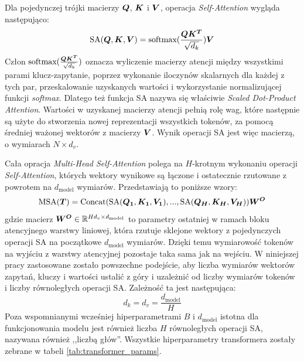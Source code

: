 Dla pojedynczej trójki macierzy $\boldsymbol{Q}$, $\boldsymbol{K}$ i $\boldsymbol{V}$, operacja
\emph{Self-Attention} wygląda następująco:
\begin{equation} \label{eq:sa}
    \textrm{SA}(\boldsymbol{Q}, \boldsymbol{K}, \boldsymbol{V}) = \textrm{softmax}(\frac{\boldsymbol{Q}\boldsymbol{K^T}}{\sqrt{d_k}})\boldsymbol{V}
\end{equation}
Człon $\textrm{softmax}(\frac{\boldsymbol{Q}\boldsymbol{K^T}}{\sqrt{d_k}})$ oznacza wyliczenie macierzy
atencji między wszystkimi parami klucz-zapytanie, poprzez wykonanie iloczynów skalarnych dla
każdej z tych par, przeskalowanie uzyskanych wartości i wykorzystanie normalizującej funkcji
\emph{softmax}. Dlatego też funkcja SA nazywa się właściwie \emph{Scaled Dot-Product Attention}.
Wartości w uzyskanej macierzy atencji pełnią rolę wag, które następnie są użyte do stworzenia
nowej reprezentacji wszystkich tokenów, za pomocą średniej ważonej wektorów z macierzy $\boldsymbol{V}$.
Wynik operacji SA jest więc macierzą, o wymiarach $N \times d_v$.

Cała opracja \emph{Multi-Head Self-Attention} polega na $H$-krotnym wykonaniu operacji
\emph{Self-Attention}, których wektory wynikowe są łączone i ostatecznie rzutowane z powrotem na
$d_{\mathrm{model}}$ wymiarów. Przedstawiają to poniższe wzory:
\begin{equation}
    \textrm{MSA}(\boldsymbol{T}) = \textrm{Concat}(\textrm{SA}(\boldsymbol{Q_1}, \boldsymbol{K_1}, \boldsymbol{V_1}), ..., \textrm{SA}(\boldsymbol{Q_H},
    \boldsymbol{K_H}, \boldsymbol{V_H}))\boldsymbol{W^O}
\end{equation}
gdzie macierz $\boldsymbol{W^O} \in \mathbb{R}^{Hd_v \times d_{\mathrm{model}}}$ to parametry ostatniej w ramach bloku
atencyjnego warstwy liniowej, która rzutuje sklejone wektory z pojedynczych operacji SA na
początkowe $d_{\mathrm{model}}$ wymiarów. Dzięki temu wymiarowość tokenów na wyjściu z warstwy
atencyjnej pozostaje taka sama jak na wejściu. W niniejszej pracy zastosowane zostało powszechne
podejście, aby liczba wymiarów wektorów zapytań, kluczy i wartości ustalić z góry i uzależnić od
liczby wymiarów tokenów i liczby równoległych operacji SA. Zależność ta jest następująca:
\begin{equation}
    d_k = d_v = \frac{d_{\mathrm{model}}}{H}
\end{equation}
Poza wspomnianymi wcześniej hiperparametrami $B$ i $d_{\mathrm{model}}$ istotna dla funkcjonowania
modelu jest również liczba $H$ równoległych operacji SA, nazywana również ,,liczbą głów''. Wszystkie
hiperparametry transformera zostały zebrane w tabeli \ref{tab:transformer_params}.

